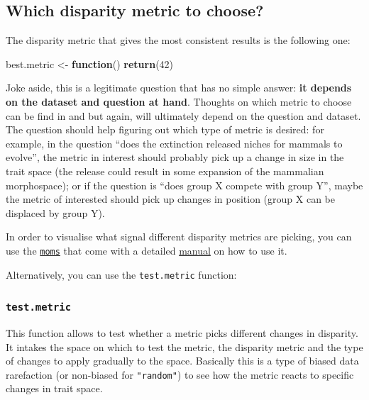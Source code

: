 \documentclass[]{book}
\newenvironment{Shaded}{\begin{snugshade}}{\end{snugshade}}
\newcommand{\ControlFlowTok}[1]{\textcolor[rgb]{0.13,0.29,0.53}{\textbf{#1}}}
\newcommand{\DecValTok}[1]{\textcolor[rgb]{0.00,0.00,0.81}{#1}}
\newcommand{\KeywordTok}[1]{\textcolor[rgb]{0.13,0.29,0.53}{\textbf{#1}}}
\newcommand{\NormalTok}[1]{#1}
\newcommand{\StringTok}[1]{\textcolor[rgb]{0.31,0.60,0.02}{#1}}
\begin{document}
\hypertarget{which-disparity-metric-to-choose}{%
\subsection{Which disparity metric to choose?}\label{which-disparity-metric-to-choose}}

The disparity metric that gives the most consistent results is the following one:

\begin{Shaded}
\begin{Highlighting}[]
\NormalTok{best.metric <-}\StringTok{ }\ControlFlowTok{function}\NormalTok{() }\KeywordTok{return}\NormalTok{(}\DecValTok{42}\NormalTok{)}
\end{Highlighting}
\end{Shaded}

Joke aside, this is a legitimate question that has no simple answer: \textbf{it depends on the dataset and question at hand}.
Thoughts on which metric to choose can be find in \citet{moms} and \citet{Guillerme2020} but again, will ultimately depend on the question and dataset.
The question should help figuring out which type of metric is desired: for example, in the question ``does the extinction released niches for mammals to evolve'', the metric in interest should probably pick up a change in size in the trait space (the release could result in some expansion of the mammalian morphospace); or if the question is ``does group X compete with group Y'', maybe the metric of interested should pick up changes in position (group X can be displaced by group Y).

In order to visualise what signal different disparity metrics are picking, you can use the \href{https://tguillerme.shinyapps.io/moms/}{\texttt{moms}} that come with a detailed \href{https://rawcdn.githack.com/TGuillerme/moms/master/inst/moms_vignette.html}{manual} on how to use it.

Alternatively, you can use the \texttt{test.metric} function:

\hypertarget{test-metric}{%
\subsubsection{\texorpdfstring{\texttt{test.metric}}{test.metric}}\label{test-metric}}

This function allows to test whether a metric picks different changes in disparity. It intakes the space on which to test the metric, the disparity metric and the type of changes to apply gradually to the space.
Basically this is a type of biased data rarefaction (or non-biased for \texttt{"random"}) to see how the metric reacts to specific changes in trait space.
\end{document}
